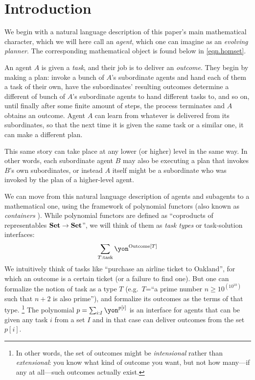 \chapter{Introduction}\label{sec:intro}

We begin with a natural language description of this paper's main mathematical character, which we will here call an \emph{agent}, which one can imagine as an \emph{evolving planner}. The corresponding mathematical object is found below in \eqref{eqn.homset}.

An agent $A$ is given a \emph{task}, and their job is to deliver an \emph{outcome}. They begin by making a plan: invoke a bunch of $A$'s subordinate agents and hand each of them a task of their own, have the subordinates' resulting outcomes determine a different of bunch of $A$'s subordinate agents to hand different tasks to, and so on, until finally after some finite amount of steps, the process terminates and $A$ obtains an outcome. Agent $A$ can learn from whatever is delivered from its subordinates, so that the next time it is given the same task or a similar one, it can make a different plan. 

This same story can take place at any lower (or higher) level in the same way. In other words, each subordinate agent $B$ may also be executing a plan that invokes $B$'s own subordinates, or instead $A$ itself might be a subordinate who was invoked by the plan of a higher-level agent.

We can move from this natural language description of agents and subagents to a mathematical one, using the framework of polynomial functors (also known as \emph{containers} \cite{abbott2005containers,abbot2003categoriesthesis,ahman2014when}). While polynomial functors are defined as ``coproducts of representables $\mathbf{Set}\to\mathbf{Set}$'', we will think of them as \emph{task types} or task-solution interfaces:
\[
\sum_{T:\text{task}}\yon^{\text{Outcome}[T]}
\]
We intuitively think of tasks like ``purchase an airline ticket to Oakland'', for which an outcome is a certain ticket (or a failure to find one). But one can formalize the notion of task as a type $T$ (e.g.\ $T$=``a prime number $n\geq10^{(10^{10})}$ such that $n+2$ is also prime''), and formalize its outcomes as the terms of that type.%
\footnote{In other words, the set of outcomes might be \emph{intensional} rather than \emph{extensional}: you know what kind of outcome you want, but not how many---if any at all---such outcomes actually exist.} The polynomial $p=\sum_{i:I}\yon^{p[i]}$ is an interface for agents that can be given any task $i$ from a set $I$ and in that case can deliver outcomes from the set $p[i]$.

